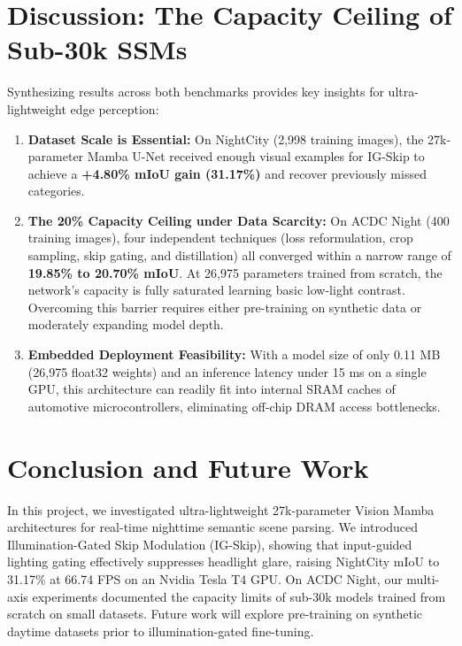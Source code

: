 \documentclass[conference]{IEEEtran}
\begin{document}
\section{Discussion: The Capacity Ceiling of Sub-30k SSMs}
Synthesizing results across both benchmarks provides key insights for ultra-lightweight edge perception:
\begin{enumerate}
    \item \textbf{Dataset Scale is Essential:} On NightCity (2,998 training images), the 27k-parameter Mamba U-Net received enough visual examples for IG-Skip to achieve a \textbf{+4.80\% mIoU gain (31.17\%)} and recover previously missed categories.
    \item \textbf{The 20\% Capacity Ceiling under Data Scarcity:} On ACDC Night (400 training images), four independent techniques (loss reformulation, crop sampling, skip gating, and distillation) all converged within a narrow range of \textbf{19.85\% to 20.70\% mIoU}. At 26,975 parameters trained from scratch, the network's capacity is fully saturated learning basic low-light contrast. Overcoming this barrier requires either pre-training on synthetic data or moderately expanding model depth.
    \item \textbf{Embedded Deployment Feasibility:} With a model size of only 0.11 MB (26,975 float32 weights) and an inference latency under 15 ms on a single GPU, this architecture can readily fit into internal SRAM caches of automotive microcontrollers, eliminating off-chip DRAM access bottlenecks.
\end{enumerate}

\section{Conclusion and Future Work}
In this project, we investigated ultra-lightweight 27k-parameter Vision Mamba architectures for real-time nighttime semantic scene parsing. We introduced Illumination-Gated Skip Modulation (IG-Skip), showing that input-guided lighting gating effectively suppresses headlight glare, raising NightCity mIoU to 31.17\% at 66.74 FPS on an Nvidia Tesla T4 GPU. On ACDC Night, our multi-axis experiments documented the capacity limits of sub-30k models trained from scratch on small datasets. Future work will explore pre-training on synthetic daytime datasets prior to illumination-gated fine-tuning.
\end{document}

